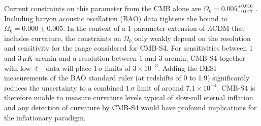 Current constraints on this parameter from the CMB alone are $\Omega_k= 0.005^{+0.016}_{-0.017}$ \cite{Ade:2015xua}. Including baryon acoustic oscillation (BAO) data tightens the bound to $\Omega_k=0.000\pm0.005$. %
In the context of a 1-parameter extension of $\Lambda$CDM that includes curvature, the constraints on $\Omega_k$ only weakly depend on the resolution and sensitivity for the range considered for CMB-S4. For sensitivities between $1$ and $3\,\mu K$-arcmin and a resolution between $1$ and $3$ arcmin, CMB-S4 together with low-$\ell$ \planck\ data will place $1\,\sigma$ limits of $3\times10^{-3}$.
Adding the DESI measurements of the BAO standard ruler (at redshifts of 0 to 1.9) significantly reduces the uncertainty to a combined $1\,\sigma$ limit of around $7.1\times10^{-4}$. CMB-S4 is therefore unable to measure curvature levels typical of slow-roll eternal inflation and any detection of curvature by CMB-S4 would have profound implications for the inflationary paradigm.


